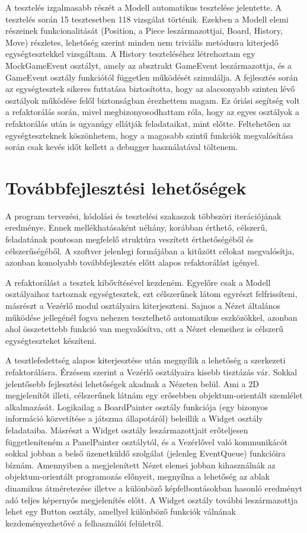 \documentclass[12pt, twoside]{report}
\begin{document}
A tesztelés izgalmasabb részét a Modell automatikus tesztelése jelentette. A tesztelés során 15 tesztesetben 118 vizsgálat történik. Ezekben a Modell elemi részeinek funkcionalitását (Position, a Piece leszármazottjai, Board, History, Move) részletes, lehetőség szerint minden nem triviális metódusra kiterjedő egységtesztekkel vizsgáltam. A History teszteléséhez létrehoztam egy MockGameEvent osztályt, amely az absztrakt GameEvent leszármazottja, és a GameEvent osztály funkciótól független működését szimulálja. A fejlesztés során az egységtesztek sikeres futtatása biztosította, hogy az alacsonyabb szinten lévő osztályok működése felől biztonságban érezhettem magam. Ez óriási segítség volt a refaktorálás során, mivel megbizonyosodhattam róla, hogy az egyes osztályok a refaktorálás után is ugyanúgy ellátják feladataikat, mint előtte. Feltehetően az egységteszteknek köszönhetem, hogy a magasabb szintű funkciók megvalósítása során csak kevés időt kellett a debugger használatával töltenem.

\section{Továbbfejlesztési lehetőségek}

A program tervezési, kódolási és tesztelési szakaszok többszöri iterációjának eredménye. Ennek mellékhatásaként néhány, korábban érthető, célszerű, feladatának pontosan megfelelő struktúra veszített érthetőségéből és célszerűségéből. A szoftver jelenlegi formájában a kitűzött célokat megvalósítja, azonban komolyabb továbbfejlesztés előtt alapos refaktorálást igényel.

A refaktorálást a tesztek kibővítésével kezdeném. Egyelőre csak a Modell osztályaihoz tartoznak egységtesztek, ezt célszerűnek látom egyrészt felfrissíteni, másrészt a Vezérlő modul osztályaira kiterjeszteni. Sajnos a Nézet általános működése jellegénél fogva nehezen tesztelhető automatikus eszközökkel, azonban ahol összetettebb funkció van megvalósítva, ott a Nézet elemeihez is célszerű egységteszteket készíteni.

A tesztlefedettség alapos kiterjesztése után megnyílik a lehetőség a szerkezeti refaktorálásra. Érzésem szerint a Vezérlő osztályaira kisebb tisztázás vár. Sokkal jelentősebb fejlesztési lehetőségek akadnak a Nézeten belül. Ami a 2D megjelenítőt illeti, célszerűnek látnám egy erősebben objektum-orientált szemlélet alkalmazását. Logikailag a BoardPainter osztály funkciója (egy bizonyos információ közvetítése a játszma állapotáról) beleillik a Widget osztály feladataiba. Másrészt a Widget osztály leszármazottjait erőteljesen függetleníteném a PanelPainter osztálytól, és a Vezérlővel való kommunikácót sokkal jobban a belső üzenetküldő szolgálat (jelenleg EventQueue) funkcióira bíznám. Amennyiben a megjelenített Nézet elemei jobban kihasználnák az objektum-orientált programozás előnyeit, megnyílna a lehetőség az ablak dinamikus átméretezése illetve a különböző képfelbontásokban hasonló eredményt adó teljes képernyős megjelenítés előtt. A Widget osztály további leszármazottja lehet egy Button osztály, amellyel különböző funkciók válnának kezdeményezhetővé a felhasználói felületről.
\end{document}
